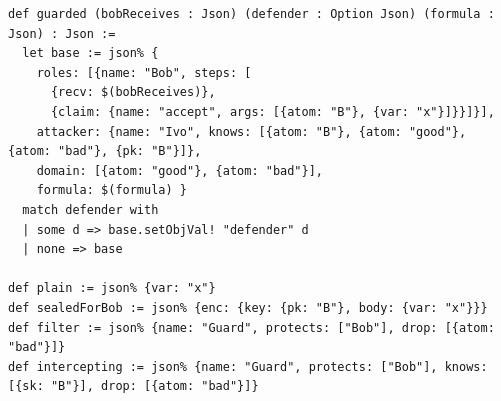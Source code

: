 \begin{lstlisting}[language={}]
def guarded (bobReceives : Json) (defender : Option Json) (formula : Json) : Json :=
  let base := json% {
    roles: [{name: "Bob", steps: [
      {recv: $(bobReceives)},
      {claim: {name: "accept", args: [{atom: "B"}, {var: "x"}]}}]}],
    attacker: {name: "Ivo", knows: [{atom: "B"}, {atom: "good"}, {atom: "bad"}, {pk: "B"}]},
    domain: [{atom: "good"}, {atom: "bad"}],
    formula: $(formula) }
  match defender with
  | some d => base.setObjVal! "defender" d
  | none => base

def plain := json% {var: "x"}
def sealedForBob := json% {enc: {key: {pk: "B"}, body: {var: "x"}}}
def filter := json% {name: "Guard", protects: ["Bob"], drop: [{atom: "bad"}]}
def intercepting := json% {name: "Guard", protects: ["Bob"], knows: [{sk: "B"}], drop: [{atom: "bad"}]}
\end{lstlisting}
